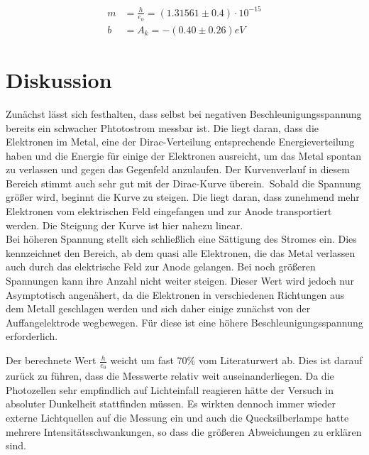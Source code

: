 \begin{align*}
m&=\frac{h}{e_0}= (1.31561 \pm 0.4)\cdot10^{-15}\\
b&=A_k= -(0.40 \pm 0.26) eV
\end{align*}

\section{Diskussion}
Zunächst lässt sich festhalten, dass selbst bei negativen Beschleunigungsspannung bereits ein schwacher Phtotostrom messbar ist. Die liegt daran, dass die Elektronen im Metal, eine der Dirac-Verteilung entsprechende Energieverteilung haben und die Energie für einige der Elektronen ausreicht, um das Metal spontan zu verlassen und gegen das Gegenfeld anzulaufen. Der Kurvenverlauf in diesem Bereich stimmt auch sehr gut mit der Dirac-Kurve überein.\
Sobald die Spannung größer wird, beginnt die Kurve zu steigen. Die liegt daran, dass zunehmend mehr Elektronen vom elektrischen Feld eingefangen und zur Anode transportiert werden. Die Steigung der Kurve ist hier nahezu linear.\\
Bei höheren Spannung stellt sich schließlich eine Sättigung des Stromes ein. Dies kennzeichnet den Bereich, ab dem quasi alle Elektronen, die das Metal verlassen auch durch das elektrische Feld zur Anode gelangen. Bei noch größeren Spannungen kann ihre Anzahl nicht weiter steigen. Dieser Wert wird jedoch nur Asymptotisch angenähert, da die Elektronen in verschiedenen Richtungen aus dem Metall geschlagen werden und sich daher einige zunächst von der Auffangelektrode wegbewegen. Für diese ist eine höhere Beschleunigungsspannung erforderlich.

Der berechnete Wert $\frac{h}{e_0}$ weicht um fast 70\% vom Literaturwert ab. Dies ist darauf zurück zu führen, dass die Messwerte relativ weit auseinanderliegen. Da die Photozellen sehr empfindlich auf Lichteinfall reagieren hätte der Versuch in absoluter Dunkelheit stattfinden müssen. Es wirkten dennoch immer wieder externe Lichtquellen auf die Messung ein und auch die Quecksilberlampe hatte mehrere Intensitätsschwankungen, so dass die größeren Abweichungen zu erklären sind.






